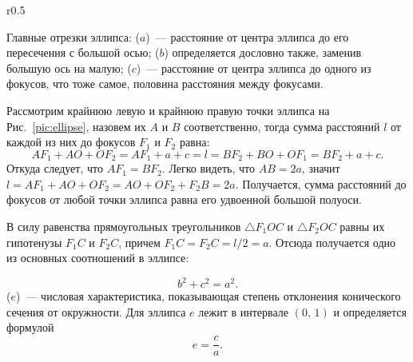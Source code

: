 \begin{wrapfigure}[10]{r}{0.5\tw}
    \caption{Эллипс}
    \label{pic:ellipse}
\end{wrapfigure}
Главные отрезки эллипса:  ($a$)~--- расстояние от центра эллипса до его пересечения с большой осью;  ($b$) определяется дословно также, заменив большую ось на малую;  ($c$)~--- расстояние от центра эллипса до одного из фокусов, что тоже самое, половина расстояния между фокусами.

Рассмотрим крайнюю левую и крайнюю правую точки эллипса на Рис.~\ref{pic:ellipse}, назовем их $A$ и $B$ соответственно, тогда сумма расстояний $l$ от каждой из них до фокусов $F_1$ и $F_2$ равна:
\begin{equation*}
    AF_1 + AO + OF_2 = AF_1 + a + c = l = BF_2 + BO + OF_1 = BF_2 + a + c.
\end{equation*}
Откуда следует, что $A F_1 = B F_2$. Легко видеть, что $AB = 2a$, значит $l = AF_1 + AO + OF_2 = AO + OF_2 + F_2B = 2a$. Получается, сумма расстояний до фокусов от любой точки эллипса равна его удвоенной большой полуоси.

В силу равенства прямоугольных треугольников $\triangle F_1 O C$ и $\triangle F_2 O C$ равны их гипотенузы $F_1C$ и $F_2C$, причем $F_1C= F_2C = l/2 = a$. Отсюда получается одно из основных соотношений в эллипсе:

\begin{equation}
    b^2 + c^2 = a^2.
\end{equation}
 ($e$)~--- числовая
характеристика, показывающая степень отклонения конического сечения от окружности. Для эллипса $e$ лежит в интервале $(0, \, 1)$ и
определяется формулой
\begin{equation}
    e = \frac{c}{a}.
\end{equation}

